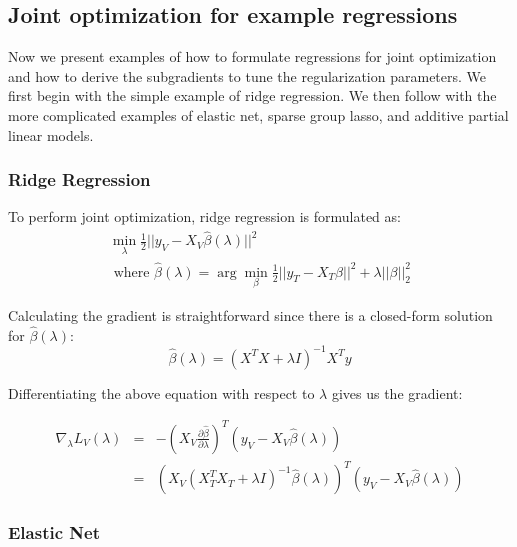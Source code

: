 \documentclass[10pt,letterpaper]{article}
\begin{document}
\subsection{Joint optimization for example regressions}

Now we present examples of how to formulate regressions for joint optimization and how to derive the subgradients to tune the regularization parameters. We first begin with the simple example of ridge regression. We then follow with the more complicated examples of elastic net, sparse group lasso, and additive partial linear models.

\subsubsection{Ridge Regression}

To perform joint optimization, ridge regression is formulated as:
\begin{equation}
\begin{array}{c}
\min_\lambda \frac{1}{2} \lvert\lvert y_V - X_V \hat \beta (\lambda) \rvert\rvert ^2 \\
\text{  where  } \hat \beta (\lambda) = \arg \min_\beta \frac{1}{2} \lvert\lvert y_T - X_T \beta \rvert\rvert ^2 + \lambda \lvert\lvert \beta \rvert\rvert_2^2
\end{array}
\end{equation}

Calculating the gradient is straightforward since there is a closed-form solution for $\hat \beta(\lambda)$:
\begin{equation}
\hat \beta (\lambda) = (X^TX + \lambda I)^{-1}X^Ty
\end{equation}

Differentiating the above equation with respect to $\lambda$ gives us the gradient:

\begin{equation}
\begin{array} {lcl}
\nabla_\lambda L_V(\lambda) &=& - (X_V \frac{\partial \hat\beta}{\partial \lambda})^T (y_V - X_V \hat \beta (\lambda)) \\
&=& (X_V(X_T^T X_T + \lambda I)^{-1}\hat \beta (\lambda))^T(y_V - X_V \hat\beta (\lambda))
\end{array}
\end{equation}

\subsubsection{Elastic Net}
\end{document}
